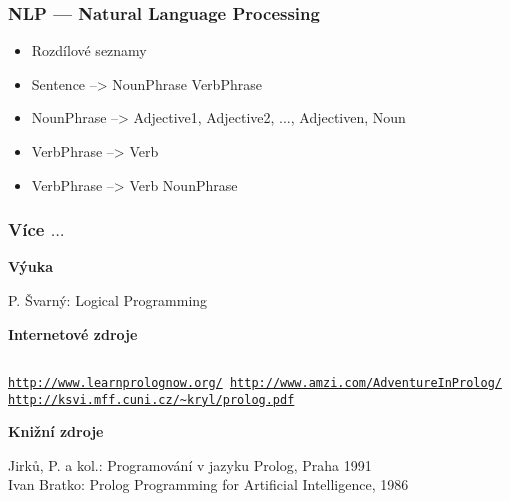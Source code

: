 \documentclass[red,professionalfont]{beamer}
\theoremstyle{definition}
\newcommand{\0}{\mbox{${\bf 0}$}}
\renewcommand{\emph}[1]{{\bf #1}}
\begin{document}
\begin{frame}\frametitle{NLP --- Natural Language Processing}
\begin{itemize}
 \item Rozdílové seznamy
 \item Sentence --> NounPhrase VerbPhrase
 \item NounPhrase --> Adjective1, Adjective2, ..., Adjectiven, Noun
 \item VerbPhrase --> Verb
 \item VerbPhrase --> Verb NounPhrase
\end{itemize}
\end{frame}


\begin{frame}\frametitle{Více $\ldots$}
\begin{center}
 \emph{Výuka}\pause
\end{center}
P. Švarný: Logical Programming\pause
\vskip1cm
\begin{center}
 \emph{Internetové zdroje}\pause
\end{center}
{\tt
 \url{http://www.learnprolognow.org/}\pause\
 \url{http://www.amzi.com/AdventureInProlog/}\pause\
 \url{http://ksvi.mff.cuni.cz/\~kryl/prolog.pdf}\pause\
 }
 \begin{center}
   \emph{Knižní zdroje}\pause
 \end{center}
 Jirků, P. a kol.: Programování v jazyku Prolog, Praha 1991\\
 Ivan Bratko: Prolog Programming for Artificial Intelligence, 1986\\
\end{frame}
\end{document}
